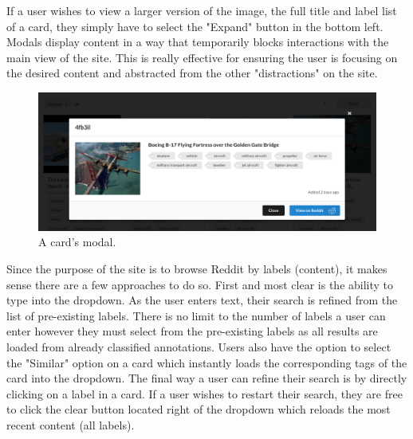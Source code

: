 \documentclass[msc,oneside]{ubcthesis}%
\begin{document}
\par
If a user wishes to view a larger version of the image, the full title and label list of a card, they simply have to select the "Expand" button in the bottom left. Modals display content in a way that temporarily blocks interactions with the main view of the site. This is really effective for ensuring the user is focusing on the desired content and abstracted from the other "distractions" on the site.
\begin{figure}[H]
\includegraphics[width=\textwidth]{modal.png}
\caption{A card's modal.}
\end{figure}
\par
Since the purpose of the site is to browse Reddit by labels (content), it makes sense there are a few approaches to do so. First and most clear is the ability to type into the dropdown. As the user enters text, their search is refined from the list of pre-existing labels. There is no limit to the number of labels a user can enter however they must select from the pre-existing labels as all results are loaded from already classified annotations. Users also have the option to select the "Similar" option on a card which instantly loads the corresponding tags of the card into the dropdown. The final way a user can refine their search is by directly clicking on a label in a card. If a user wishes to restart their search, they are free to click the clear button located right of the dropdown which reloads the most recent content (all labels).
\end{document}
